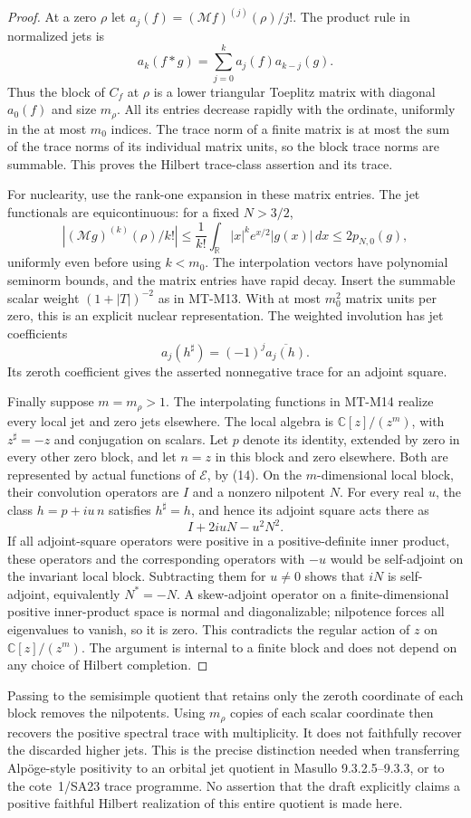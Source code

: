 \begin{proof}
At a zero $\rho$ let $a_j(f)=(\mathcal Mf)^{(j)}(\rho)/j!$.
The product rule in normalized jets is
\[
       a_k(f*g)=\sum_{j=0}^k a_j(f)a_{k-j}(g).
\]
Thus the block of $C_f$ at $\rho$ is a lower triangular
Toeplitz matrix with diagonal $a_0(f)$ and size $m_\rho$.
All its entries decrease rapidly with the ordinate,
uniformly in the at most $m_0$ indices.
The trace norm of a finite matrix is at most the sum
of the trace norms of its individual matrix units,
so the block trace norms are summable. This proves
the Hilbert trace-class assertion and its trace.

For nuclearity, use the rank-one expansion in these
matrix entries. The jet functionals are equicontinuous:
for a fixed $N>3/2$,
\[
 |(\mathcal Mg)^{(k)}(\rho)/k!|
 \le \frac1{k!}\int_{\mathbb R}|x|^k e^{x/2}|g(x)|\,dx
 \le2p_{N,0}(g),
\]
uniformly even before using $k<m_0$.
The interpolation vectors have polynomial seminorm
bounds, and the matrix entries have rapid decay.
Insert the summable scalar weight $(1+|T|)^{-2}$
as in MT-M13. With at most $m_0^2$ matrix units per
zero, this is an explicit nuclear representation.
The weighted involution has jet coefficients
\[
                   a_j(h^\sharp)=(-1)^j\overline{a_j(h)}.
\]
Its zeroth coefficient gives the asserted nonnegative
trace for an adjoint square.

Finally suppose $m=m_\rho>1$. The interpolating functions
in MT-M14 realize every local jet and zero jets elsewhere.
The local algebra is $\mathbb C[z]/(z^m)$, with
$z^\sharp=-z$ and conjugation on scalars.
Let $p$ denote its identity, extended by zero in every
other zero block, and let $n=z$ in this block and zero
elsewhere. Both are represented by actual functions
of $\mathcal E$, by (14). On the $m$-dimensional local
block, their convolution operators are $I$ and a
nonzero nilpotent $N$.
For every real $u$, the class $h=p+iu\,n$ satisfies
$h^\sharp=h$, and hence its adjoint square acts there as
\[
                         I+2iuN-u^2N^2.
\]
If all adjoint-square operators were positive in a
positive-definite inner product, these operators and
the corresponding operators with $-u$ would be
self-adjoint on the invariant local block.
Subtracting them for $u\ne0$ shows that $iN$ is
self-adjoint, equivalently $N^*=-N$.
A skew-adjoint operator on a finite-dimensional positive
inner-product space is normal and diagonalizable;
nilpotence forces all eigenvalues to vanish, so it is
zero. This contradicts the regular action of $z$
on $\mathbb C[z]/(z^m)$.
The argument is internal to a finite block and
does not depend on any choice of Hilbert completion.
\end{proof}

Passing to the semisimple quotient that retains only the
zeroth coordinate of each block removes the nilpotents.
Using $m_\rho$ copies of each scalar coordinate then
recovers the positive spectral trace with multiplicity.
It does not faithfully recover the discarded higher
jets. This is the precise distinction needed when
transferring Alpöge-style positivity to an orbital
jet quotient in Masullo 9.3.2.5--9.3.3, or to the
cote~1/SA23 trace programme. No assertion that the
draft explicitly claims a positive faithful Hilbert
realization of this entire quotient is made here.
